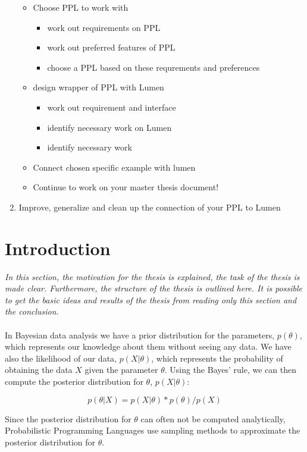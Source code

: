 \documentclass{article}
\begin{document}
\begin{enumerate}
\begin{itemize}
		\item Choose PPL to work with
		\begin {itemize}
		\item work out requirements on PPL
		\item work out preferred features of PPL
		\item choose a PPL based on these requrements and preferences
	\end{itemize}
	\item design wrapper of PPL with Lumen
	\begin{itemize}
		\item work out requirement and interface
		\item identify necessary work on Lumen
		\item identify necessary work
	\end{itemize}
	\item Connect chosen specific example with lumen
	\item Continue to work on your master thesis document!
\end{itemize}
\item Improve, generalize and clean up the connection of your PPL to Lumen
\end{enumerate}

\section{Introduction}

\textit{In this section, the motivation for the thesis is explained, the task of the thesis is made clear. Furthermore, the structure of the thesis is outlined here. It is possible to get the basic ideas and results of the thesis from reading only this section and the conclusion.}
\\
\\
In Bayesian data analysis we have a prior distribution for the parameters, $p(\theta)$, which represents our knowledge about them without seeing any data. We have also the likelihood of our data, $p(X|\theta)$, which represents the probability of obtaining the data $X$ given the parameter $\theta$. Using the Bayes' rule, we can then compute the posterior distribution for $\theta$, $p(X|\theta)$:

\begin{equation}
p(\theta|X) = p(X|\theta) * p(\theta) / p(X)
\end{equation}

Since the posterior distribution for $\theta$ can often not be computed analytically, Probabilistic Programming Languages use sampling methods to approximate the posterior distribution for $\theta$.
\end{document}
